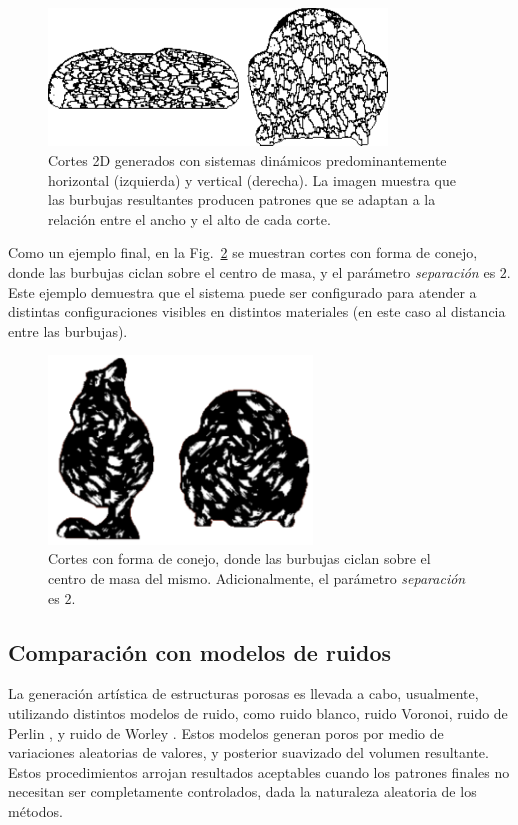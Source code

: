 \begin{figure}
  \centerline{\includegraphics[width=9cm]{figures/Fig6}}
  \caption[Cortes 2D generados con sistemas dinámicos produciendo patrones horizontales y verticales]{Cortes 2D generados con sistemas dinámicos predominantemente horizontal (izquierda) y vertical (derecha). La imagen muestra que las burbujas resultantes producen patrones que se adaptan a la relación entre el ancho y el alto de cada corte.}
  \label{fg:Fig6}
\end{figure}


Como un ejemplo final, en la Fig.~\ref{fg:Fig7} se muestran cortes con forma de conejo, donde las burbujas ciclan sobre el centro de masa, y el parámetro {\em separación} es $2$.
Este ejemplo demuestra que el sistema puede ser configurado para atender a distintas configuraciones visibles en distintos materiales (en este caso al distancia entre las burbujas).


\begin{figure}
  \centerline{\includegraphics[width=7cm]{figures/Fig7}}
  \caption[Cortes con forma de conejo y parámetro separación igual a 2]{Cortes con forma de conejo, donde las burbujas ciclan sobre el centro de masa del mismo. Adicionalmente, el parámetro {\em separación} es $2$.}
  \label{fg:Fig7}
\end{figure}

\subsection{Comparación con modelos de ruidos}
La generación artística de estructuras porosas es llevada a cabo, usualmente, utilizando distintos modelos de ruido, como ruido blanco, ruido Voronoi, ruido de Perlin \cite{Perlin1985}, y ruido de Worley \cite{Worley1996}.
Estos modelos generan poros por medio de variaciones aleatorias de valores, y posterior suavizado del volumen resultante.
Estos procedimientos arrojan resultados aceptables cuando los patrones finales no necesitan ser completamente controlados, dada la naturaleza aleatoria de los métodos.

